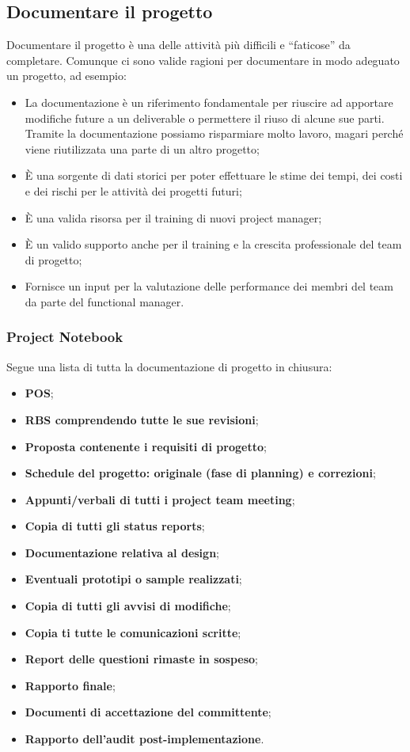 \subsection{Documentare il progetto}
Documentare il progetto è una delle attività più difficili e “faticose” da completare. Comunque ci sono valide ragioni per documentare in modo adeguato un progetto, ad esempio:
\begin{itemize}
	\item La documentazione è un riferimento fondamentale per riuscire ad apportare modifiche future a un deliverable o permettere il riuso di alcune sue parti. Tramite la documentazione possiamo risparmiare molto lavoro, magari perché viene riutilizzata una parte di un altro progetto;
	\item È una sorgente di dati storici per poter effettuare le stime dei tempi, dei costi e dei rischi per le attività dei progetti futuri;
	\item È una valida risorsa per il training di nuovi project manager;
	\item È un valido supporto anche per il training e la crescita professionale del team di progetto;
	\item Fornisce un input per la valutazione delle performance dei membri del team da parte del functional manager.
\end{itemize}
\subsubsection{Project Notebook}
Segue una lista di tutta la documentazione di progetto in chiusura:
\begin{itemize}
	\item \textbf{POS};
	\item \textbf{RBS comprendendo tutte le sue revisioni};
	\item \textbf{Proposta contenente i requisiti di progetto};
	\item \textbf{Schedule del progetto: originale (fase di planning) e correzioni};
	\item \textbf{Appunti/verbali di tutti i project team meeting};
	\item \textbf{Copia di tutti gli status reports};
	\item \textbf{Documentazione relativa al design};
	\item \textbf{Eventuali prototipi o sample realizzati};
	\item \textbf{Copia di tutti gli avvisi di modifiche};
	\item \textbf{Copia ti tutte le comunicazioni scritte};
	\item \textbf{Report delle questioni rimaste in sospeso};
	\item \textbf{Rapporto finale};
	\item \textbf{Documenti di accettazione del committente};
	\item \textbf{Rapporto dell’audit post-implementazione}.
\end{itemize}
